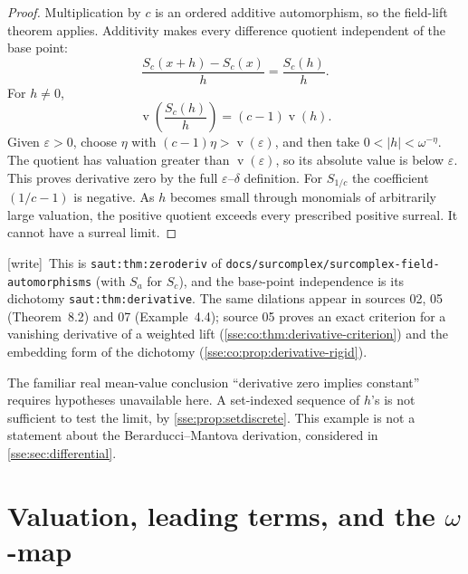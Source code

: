 \documentclass[11pt,a4paper]{article}
\numberwithin{equation}{section}
\theoremstyle{plain}
\newtheorem{proposition}[theorem]{Proposition}
\theoremstyle{definition}
\theoremstyle{remark}
\newcommand{\No}{\mathbf{No}}
\newcommand{\val}{\operatorname{v}}
\newcommand{\lbl}[1]{\nolinkurl{#1}}%
\newcommand{\fn}[1]{\nolinkurl{#1}}%
\newcommand{\wtag}{\textup{\textsf{[write]}}}%
\newenvironment{wnote}{\par\smallskip\noindent\wtag\ }{\par\smallskip}
\begin{document}
\begin{proof}
Multiplication by $c$ is an ordered additive automorphism, so the field-lift
theorem applies. Additivity makes every difference quotient independent
of the base point:
\[
 \frac{S_c(x+h)-S_c(x)}h=\frac{S_c(h)}h.
\]
For $h\ne0$,
\begin{equation}\label{sse:eq:derivval}
 \val\!\left(\frac{S_c(h)}h\right)=(c-1)\val(h).
\end{equation}
Given $\varepsilon>0$, choose $\eta$ with
$(c-1)\eta>\val(\varepsilon)$, and then take
$0<|h|<\omega^{-\eta}$. The quotient has valuation greater than
$\val(\varepsilon)$, so its absolute value is below $\varepsilon$.
This proves derivative zero by the full $\varepsilon$--$\delta$ definition.
For $S_{1/c}$ the coefficient $(1/c-1)$ is negative. As $h$ becomes small
through monomials of arbitrarily large valuation, the positive quotient
exceeds every prescribed positive surreal. It cannot have a surreal limit.
\end{proof}
\begin{wnote}This is \lbl{saut:thm:zeroderiv} of \fn{docs/surcomplex/surcomplex-field-automorphisms} (with $S_a$ for $S_c$), and the base-point independence is its dichotomy \lbl{saut:thm:derivative}. The same dilations appear in sources 02, 05 (Theorem~8.2) and 07 (Example~4.4); source 05 proves an exact criterion for a vanishing derivative of a weighted lift (\cref{sse:co:thm:derivative-criterion}) and the embedding form of the dichotomy (\cref{sse:co:prop:derivative-rigid}).\end{wnote}
The familiar real mean-value conclusion ``derivative zero implies
constant'' requires hypotheses unavailable here. A set-indexed sequence
of $h$'s is not sufficient to test the limit, by
\cref{sse:prop:setdiscrete}. This example is not a statement about the
Berarducci--Mantova derivation, considered in \cref{sse:sec:differential}.

\section{Valuation, leading terms, and the \texorpdfstring{$\omega$}{omega}-map}\label{sse:sec:valuation}
\end{document}
